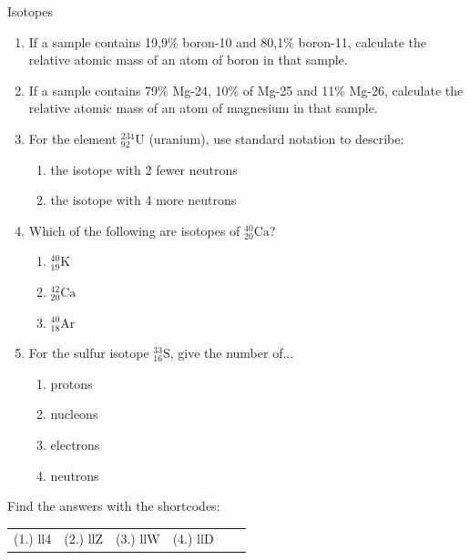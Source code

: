 \begin{exercises}  {Isotopes }
\begin{enumerate}[noitemsep, label=\textbf{\arabic*}. ]
\item If a sample contains 19,9\% boron-10 and 80,1\% boron-11, calculate the relative atomic mass of an atom of boron in that sample.
\hspace{1ex}        
\label{m38753*uid7100}\item If a sample contains 79\% Mg-24, 10\% of Mg-25 and 11\% Mg-26, calculate the relative atomic mass of an atom of magnesium in that sample.
\item For the element $^{234}_{92}{\text{U}}$ (uranium), use standard notation to describe:
\begin{enumerate}[noitemsep, label=\textbf{\alph*}. ]
 \item the isotope with 2 fewer neutrons
 \item the isotope with 4 more neutrons
\end{enumerate}
\item Which of the following are isotopes of $^{40}_{20}\text{Ca}$?
\begin{enumerate}[noitemsep, label=\textbf{\alph*}. ]
 \item $^{40}_{19}\text{K}$
 \item $^{42}_{20}\text{Ca}$
 \item $^{40}_{18}\text{Ar}$
\end{enumerate}
\item For the sulfur isotope $^{33}_{16}\text{S}$, give the number of...
	\begin{enumerate}[noitemsep, label=\textbf{\alph*}. ]
	\item{protons}
	\item{nucleons}
	\item{electrons}
	\item{neutrons}
	\end{enumerate}
\hspace{1ex}        
                \end{enumerate}
      \label{m38753*uid68}
\par {} Find the answers with the shortcodes:
 \par \begin{tabular}[h]{cccccc}
 (1.) ll4  &  (2.) llZ  &  (3.) llW  &  (4.) llD  & \end{tabular}

\end{exercises}

